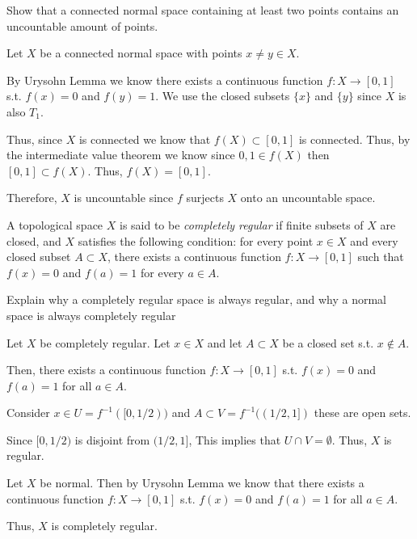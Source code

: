 \documentclass[12pt, letterpaper]{article}
\begin{document}
\begin{problem}{}
    Show that a connected normal space containing at least two points
contains an uncountable amount of points.
\end{problem}
\begin{problemproof}
    Let $X$ be a connected normal space with points $x\neq y \in X$.

    By Urysohn Lemma we know there exists a continuous function $f: X \to [0,1]$ s.t. $f(x)=0$ and $f(y)=1$. We use the closed subsets $\{x\}$ and $\{y\}$ since $X$ is also $T_1$.

    Thus, since $X$ is connected we know that $f(X) \subset [0,1]$ is connected. Thus, by the intermediate value theorem we know since $0,1 \in f(X)$ then $[0,1] \subset f(X)$. Thus, $f(X)=[0,1]$.

    Therefore, $X$ is uncountable since $f$ surjects $X$ onto an uncountable space.
\end{problemproof}

\begin{problem}{}
    A topological space $X$ is said to be \emph{completely regular} if
finite subsets of $X$ are closed, and $X$ satisfies the following
condition: for every point $x \in X$ and every closed subset
$A \subset X$, there exists a continuous function $f:X \to [0,1]$
such that $f(x) = 0$ and $f(a) = 1$ for every $a \in A$.
\end{problem}

\begin{subproblem}{}
    Explain why a completely regular space is always regular, and
why a normal space is always completely regular
\end{subproblem}
\begin{problemproof}
    Let $X$ be completely regular. Let $x \in X$ and let $A \subset X$ be a closed set s.t. $x \notin A$.

    Then, there exists a continuous function $f: X \to [0,1]$ s.t. $f(x)=0$ and $f(a)=1$ for all $a \in A$.

    Consider $x \in U=f^{-1}([0,1/2))$ and $A \subset V=f^{-1}((1/2,1])$ these are open sets.

    Since $[0,1/2)$ is disjoint from $(1/2,1]$, This implies that $U \cap V = \emptyset$. Thus, $X$ is regular.

    Let $X$ be normal. Then by Urysohn Lemma we know that there exists a continuous function $f: X \to [0,1]$ s.t. $f(x)=0$ and $f(a)=1$ for all $a \in A$.

    Thus, $X$ is completely regular.
\end{problemproof}
\end{document}
